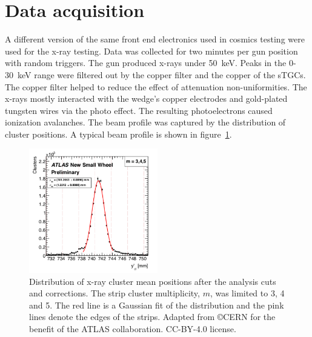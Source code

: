 
\section{Data acquisition}

A different version of the same front end electronics used in cosmics testing were used for the x-ray testing. Data was collected for two minutes per gun position with random triggers. The gun produced x-rays under \SI{50}{\kilo\electronvolt}. Peaks in the 0-\SI{30}{keV} range were filtered out by the copper filter and the copper of the sTGCs. The copper filter helped to reduce the effect of attenuation non-uniformities. The x-rays mostly interacted with the wedge's copper electrodes and gold-plated tungsten wires via the photo effect. The resulting photoelectrons caused ionization avalanches. The beam profile was captured by the distribution of cluster positions. A typical beam profile is shown in figure~\ref{fig:xray_beam_profile}.

\begin{figure}
    \centering
    \includegraphics[width = 0.5\textwidth]{figures/figure_xray_beam_profile.pdf}
    \caption{Distribution of x-ray cluster mean positions after the analysis cuts and corrections. The strip cluster multiplicity, $m$, was limited to 3, 4 and 5. The red line is a Gaussian fit of the distribution and the pink lines denote the edges of the strips. Adapted from \copyright CERN for the benefit of the ATLAS collaboration. CC-BY-4.0 license.}
    \label{fig:xray_beam_profile}
\end{figure}

